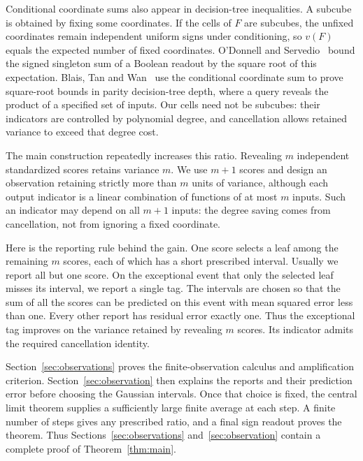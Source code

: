 Conditional coordinate sums also appear in decision-tree inequalities.
A subcube is obtained by fixing some coordinates. If the cells of
\(F\) are subcubes, the unfixed coordinates remain independent uniform
signs under conditioning, so \(v(F)\) equals the expected number of
fixed coordinates. O'Donnell and Servedio~\cite[Theorem~3 and
Lemma~3]{ODonnellServedio} bound the signed singleton sum of a Boolean
readout by the square root of this expectation. Blais, Tan and
Wan~\cite[Lemma~3.1 and Theorem~1]{BlaisTanWan} use the conditional
coordinate sum to prove square-root bounds in parity decision-tree
depth, where a query reveals the product of a specified set of inputs.
Our cells need not be subcubes: their indicators are controlled by
polynomial degree, and cancellation allows retained variance to exceed
that degree cost.

The main construction repeatedly increases this ratio. Revealing
\(m\) independent standardized scores retains variance \(m\). We use
\(m+1\) scores and design an observation retaining strictly more than
\(m\) units of variance, although each output indicator is a linear
combination of functions of at most \(m\) inputs. Such an indicator may
depend on all \(m+1\) inputs: the degree saving comes from cancellation,
not from ignoring a fixed coordinate.

Here is the reporting rule behind the gain. One score selects a leaf
among the remaining \(m\) scores, each of which has a short prescribed
interval. Usually we report all but one score. On the exceptional event
that only the selected leaf misses its interval, we report a single
tag. The intervals are chosen so that the sum of all the scores can be
predicted on this event with mean squared error less than one. Every
other report has residual error exactly one. Thus the exceptional tag
improves on the variance retained by revealing \(m\) scores.
Its indicator admits the required cancellation identity.

Section~\ref{sec:observations} proves the finite-observation calculus
and amplification criterion. Section~\ref{sec:observation} then
explains the reports and their
prediction error before choosing the Gaussian intervals. Once that
choice is fixed, the central limit theorem supplies a sufficiently large
finite average at each step. A finite number of steps gives any
prescribed ratio, and a final sign readout proves the theorem. Thus
Sections~\ref{sec:observations} and~\ref{sec:observation} contain a
complete proof of Theorem~\ref{thm:main}.

